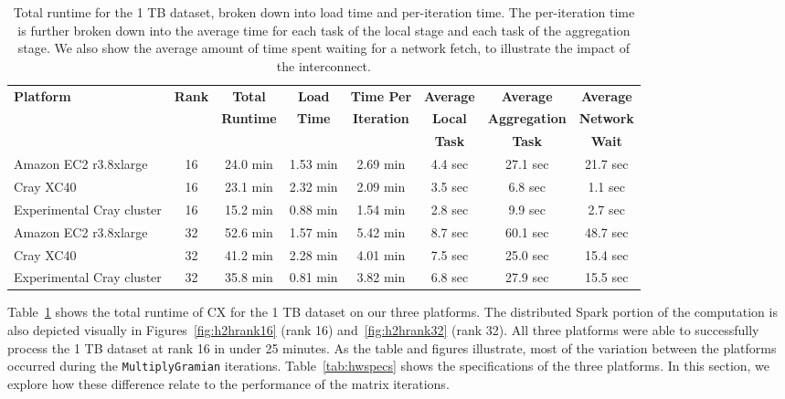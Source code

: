     \begin{table}
    \begin{center}
    \begin{tabular}{| l | c | c | c | c | c | c | c |}
    \toprule
    \textbf{Platform} & \textbf{Rank} & \textbf{Total} & \textbf{Load} & \textbf{Time Per} & \textbf{Average} & \textbf{Average} & \textbf{Average} \\
                               & & \textbf{Runtime} & \textbf{Time} & \textbf{Iteration} & \textbf{Local} & \textbf{Aggregation} & \textbf{Network} \\
                               & & & & & \textbf{Task} & \textbf{Task} & \textbf{Wait} \\
    \midrule
    Amazon EC2 r3.8xlarge & 16 & 24.0 min & 1.53 min & 2.69 min & 4.4 sec & 27.1 sec & 21.7 sec \\
    \midrule
    Cray XC40 & 16 & 23.1 min& 2.32 min & 2.09 min &  3.5 sec & 6.8 sec & 1.1 sec \\
    \midrule
    Experimental Cray cluster & 16 & 15.2 min & 0.88 min & 1.54 min &  2.8 sec & 9.9 sec & 2.7 sec \\
    \midrule
    Amazon EC2 r3.8xlarge & 32 & 52.6 min& 1.57 min & 5.42 min &  8.7 sec & 60.1 sec & 48.7 sec \\
    \midrule
    Cray XC40 & 32 & 41.2 min & 2.28 min & 4.01 min &  7.5 sec & 25.0 sec & 15.4 sec \\
    \midrule
   Experimental Cray cluster & 32 & 35.8 min & 0.81 min & 3.82 min &  6.8 sec & 27.9 sec & 15.5 sec \\
   \midrule
    \end{tabular}
    \end{center}
    \caption{Total runtime for the 1 TB dataset, broken down into load time and per-iteration time. The per-iteration time is further broken down into the average time for each task of the local stage and each task of the aggregation stage.  We also show the average amount of time spent waiting for a network fetch, to illustrate the impact of the interconnect.}
    \label{tab:h2hres1TB}
    \end{table}
    
Table~\ref{tab:h2hres1TB} shows the total runtime of CX for the 1 TB dataset on our three platforms.  The distributed Spark portion of the computation is also depicted visually in Figures~\ref{fig:h2hrank16} (rank 16) and~\ref{fig:h2hrank32} (rank 32).  All three platforms were able to successfully process the 1 TB dataset at rank 16 in under 25 minutes.  As the table and figures illustrate, most of the variation between the platforms occurred during the \texttt{MultiplyGramian} iterations.  Table~\ref{tab:hwspecs} shows the specifications of the three platforms. In this section, we explore how these difference relate to the performance of the matrix iterations.

